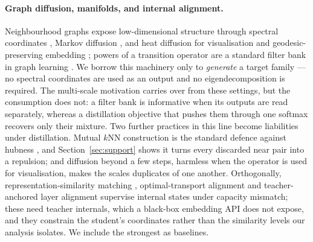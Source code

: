 \paragraph{Graph diffusion, manifolds, and internal alignment.}
Neighbourhood graphs expose low-dimensional structure through spectral coordinates
\citep{belkin2003laplacian}, Markov diffusion \citep{coifman2006diffusionmaps}, and heat
diffusion for visualisation and geodesic-preserving embedding
\citep{moon2019phate,huguet2023heat}; powers of a transition operator are a standard filter
bank in graph learning \citep{klicpera2019gdc}. We borrow this machinery only to
\emph{generate} a target family --- no spectral coordinates are used as an output and no
eigendecomposition is required. The multi-scale motivation carries over from these settings,
but the consumption does not: a filter bank is informative when its outputs are read
separately, whereas a distillation objective that pushes them through one softmax recovers
only their mixture. Two further practices in this line become liabilities under
distillation. Mutual $k$NN construction is the standard defence against hubness
\citep{radovanovic2010hubs}, and Section~\ref{sec:support} shows it turns every discarded
near pair into a repulsion; and diffusion beyond a few steps, harmless when the operator is
used for visualisation, makes the scales duplicates of one another. Orthogonally,
representation-similarity matching \citep{kornblith2019similarity}, optimal-transport
alignment \citep{alqahtani2021ot} and teacher-anchored layer alignment
\citep{dao2026talas} supervise internal states under capacity mismatch; these need teacher
internals, which a black-box embedding API does not expose, and they constrain the student's
coordinates rather than the similarity levels our analysis isolates. We include the
strongest as baselines.
